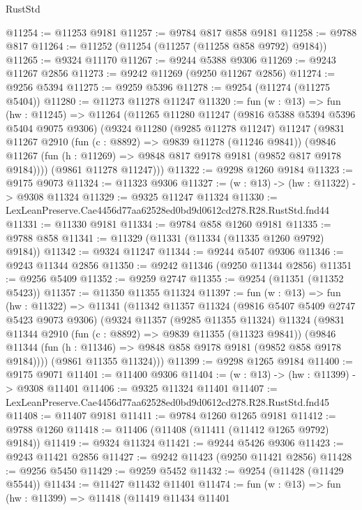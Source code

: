 \begin{lexlean}{RustStd}
\begin{coremodule}
@11254 := @11253 @9181
@11257 := @9784 @817 @858 @9181
@11258 := @9788 @817
@11264 := @11252 (@11254 (@11257 (@11258 @858 @9792) @9184))
@11265 := @9324 @11170
@11267 := @9244 @5388 @9306
@11269 := @9243 @11267 @2856
@11273 := @9242 @11269 (@9250 @11267 @2856)
@11274 := @9256 @5394
@11275 := @9259 @5396
@11278 := @9254 (@11274 (@11275 @5404))
@11280 := @11273 @11278 @11247
@11320 := fun (w : @13) =>
  fun (hw : @11245) =>
  @11264
    (@11265
      @11280
      @11247
      (@9816 @5388 @5394 @5396 @5404 @9075 @9306)
      (@9324
        @11280
        (@9285 @11278 @11247)
        @11247
        (@9831
          @11267
          @2910
          (fun (c : @8892) => @9839 @11278 (@11246 @9841))
          (@9846 @11267 (fun (h : @11269) => @9848 @817 @9178 @9181 (@9852 @817 @9178 @9184))))
        (@9861 @11278 @11247)))
@11322 := @9298 @1260 @9184
@11323 := @9175 @9073
@11324 := @11323 @9306
@11327 := (w : @13) -> (hw : @11322) -> @9308 @11324
@11329 := @9325 @11247 @11324
@11330 := LexLeanPreserve.Cae4456d77aa62528ed0bd9d0612cd278.R28.RustStd.fnd44
@11331 := @11330 @9181
@11334 := @9784 @858 @1260 @9181
@11335 := @9788 @858
@11341 := @11329 (@11331 (@11334 (@11335 @1260 @9792) @9184))
@11342 := @9324 @11247
@11344 := @9244 @5407 @9306
@11346 := @9243 @11344 @2856
@11350 := @9242 @11346 (@9250 @11344 @2856)
@11351 := @9256 @5409
@11352 := @9259 @2747
@11355 := @9254 (@11351 (@11352 @5423))
@11357 := @11350 @11355 @11324
@11397 := fun (w : @13) =>
  fun (hw : @11322) =>
  @11341
    (@11342
      @11357
      @11324
      (@9816 @5407 @5409 @2747 @5423 @9073 @9306)
      (@9324
        @11357
        (@9285 @11355 @11324)
        @11324
        (@9831
          @11344
          @2910
          (fun (c : @8892) => @9839 @11355 (@11323 @9841))
          (@9846 @11344 (fun (h : @11346) => @9848 @858 @9178 @9181 (@9852 @858 @9178 @9184))))
        (@9861 @11355 @11324)))
@11399 := @9298 @1265 @9184
@11400 := @9175 @9071
@11401 := @11400 @9306
@11404 := (w : @13) -> (hw : @11399) -> @9308 @11401
@11406 := @9325 @11324 @11401
@11407 := LexLeanPreserve.Cae4456d77aa62528ed0bd9d0612cd278.R28.RustStd.fnd45
@11408 := @11407 @9181
@11411 := @9784 @1260 @1265 @9181
@11412 := @9788 @1260
@11418 := @11406 (@11408 (@11411 (@11412 @1265 @9792) @9184))
@11419 := @9324 @11324
@11421 := @9244 @5426 @9306
@11423 := @9243 @11421 @2856
@11427 := @9242 @11423 (@9250 @11421 @2856)
@11428 := @9256 @5450
@11429 := @9259 @5452
@11432 := @9254 (@11428 (@11429 @5544))
@11434 := @11427 @11432 @11401
@11474 := fun (w : @13) =>
  fun (hw : @11399) =>
  @11418
    (@11419
      @11434
      @11401

\end{coremodule}
\end{lexlean}
